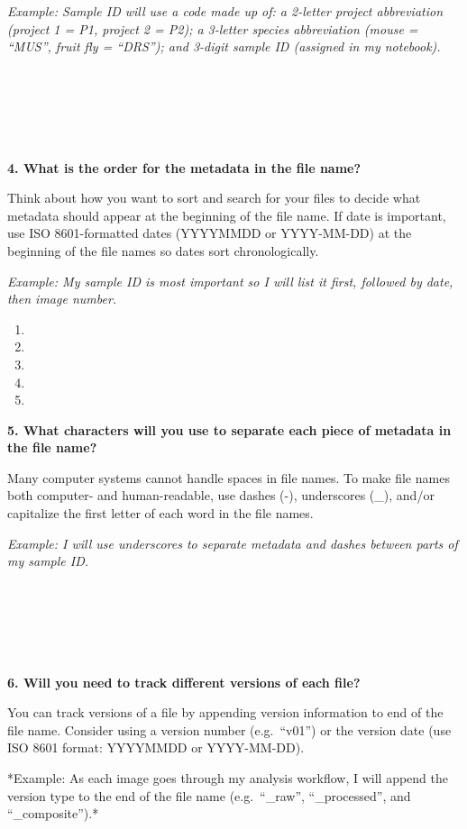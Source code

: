 \documentclass[
]{book}
\providecommand{\tightlist}{%
  \setlength{\itemsep}{0pt}\setlength{\parskip}{0pt}}
\begin{document}
\emph{Example: Sample ID will use a code made up of: a 2-letter project abbreviation (project 1 = P1, project 2 = P2); a 3-letter species abbreviation (mouse = ``MUS'', fruit fly = ``DRS''); and 3-digit sample ID (assigned in my notebook).}

~

~

~

\textbf{4. What is the order for the metadata in the file name?}

Think about how you want to sort and search for your files to decide what metadata should appear at the beginning of the file name. If date is important, use ISO 8601-formatted dates (YYYYMMDD or YYYY-MM-DD) at the beginning of the file names so dates sort chronologically.

\emph{Example: My sample ID is most important so I will list it first, followed by date, then image number.}

\begin{enumerate}
\def\labelenumi{\arabic{enumi}.}
\tightlist
\item
\item
\item
\item
\item
\end{enumerate}

\textbf{5. What characters will you use to separate each piece of metadata in the file name?}

Many computer systems cannot handle spaces in file names. To make file names both computer- and human-readable, use dashes (-), underscores (\_), and/or capitalize the first letter of each word in the file names.

\emph{Example: I will use underscores to separate metadata and dashes between parts of my sample ID.}

~

~

~

\textbf{6. Will you need to track different versions of each file?}

You can track versions of a file by appending version information to end of the file name. Consider using a version number (e.g.~``v01'') or the version date (use ISO 8601 format: YYYYMMDD or YYYY-MM-DD).

*Example: As each image goes through my analysis workflow, I will append the version type to the end of the file name (e.g.~``\_raw'', ``\_processed'', and ``\_composite'').*
\end{document}
